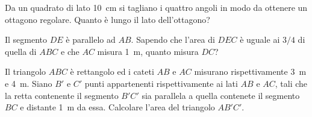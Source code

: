 \begin{multicols}{2}
%

\begin{esercizio}
\label{ese:7.105}
Da un quadrato di lato 10~cm si tagliano i quattro angoli in modo da 
ottenere un ottagono regolare. Quanto è lungo il lato dell'ottagono?
\end{esercizio}

%

\begin{esercizio}
\label{ese:7.106}
Il segmento \(DE\) è parallelo ad \(AB\). Sapendo che l'area di \(DEC\) è 
uguale ai \(3/4\) di quella di \(ABC\) e che \(AC\) misura 1~m, quanto 
misura \(DC\)?
\end{esercizio}

%

\begin{esercizio}
\label{ese:7.107}
Il triangolo \(ABC\) è rettangolo ed i cateti \(AB\) e \(AC\) misurano 
rispettivamente 3~m e 4~m. Siano \(B'\) e \(C'\) punti appartenenti 
rispettivamente ai lati \(AB\) e \(AC\), tali che la retta contenente il 
segmento \(B'C'\) sia parallela a quella contenete il segmento \(BC\) e 
distante 1~m da essa. Calcolare l'area del triangolo \(AB'C'\).
\end{esercizio}

%


\end{multicols}
